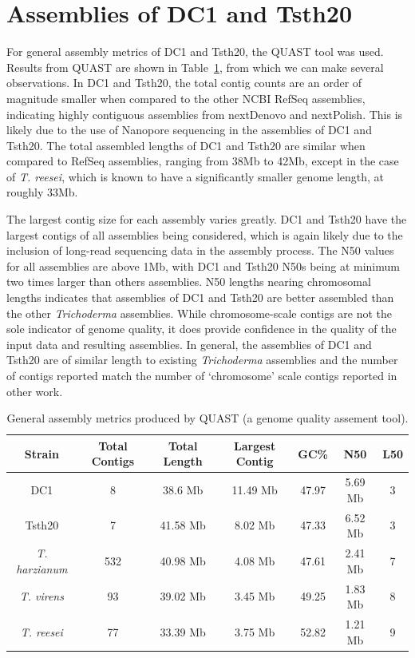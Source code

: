 \section{Assemblies of DC1 and Tsth20}

For general assembly metrics of DC1 and Tsth20, the
QUAST\cite{Gurevich2013} tool was used. Results from QUAST are shown
in Table~\ref{table:assemblies}, from which we can make several
observations. In DC1 and Tsth20, the total contig counts are an order
of magnitude smaller when compared to the other NCBI RefSeq
assemblies, indicating highly contiguous assemblies from
nextDenovo\cite{Hu2024} and nextPolish\cite{Hu2020}. This is likely
due to the use of Nanopore sequencing in the assemblies of DC1 and
Tsth20. The total assembled lengths of DC1 and Tsth20 are similar when
compared to RefSeq assemblies, ranging from 38Mb to 42Mb, except in
the case of \textit{T. reesei}, which is known to have a significantly
smaller genome length\cite{Kubicek2019}, at roughly 33Mb.

The largest contig size for each assembly varies greatly. DC1 and
Tsth20 have the largest contigs of all assemblies being considered,
which is again likely due to the inclusion of long-read sequencing
data in the assembly process. The N50 values for all assemblies are
above 1Mb, with DC1 and Tsth20 N50s being at minimum two times larger
than others assemblies. N50 lengths nearing chromosomal lengths
indicates that assemblies of DC1 and Tsth20 are better assembled than
the other \textit{Trichoderma} assemblies. While chromosome-scale
contigs are not the sole indicator of genome quality, it does provide
confidence in the quality of the input data and resulting
assemblies. In general, the assemblies of DC1 and Tsth20 are of
similar length to existing \textit{Trichoderma} assemblies and the
number of contigs reported match the number of `chromosome' scale
contigs reported in other work\cite{Kubicek2019}.

\begin{table}
  \begin{center}
    \begin{tabular}{|c|c|c|c|c|c|c|}
      \hline
      Strain & Total Contigs & Total Length & Largest Contig & GC\% & N50 & L50 \\ \hline
      DC1 & 8 & 38.6 Mb & 11.49 Mb & 47.97 & 5.69 Mb & 3 \\ \hline
      Tsth20 & 7 & 41.58 Mb & 8.02 Mb & 47.33 & 6.52 Mb & 3 \\ \hline
      \textit{T. harzianum} & 532 & 40.98 Mb & 4.08 Mb & 47.61 & 2.41 Mb & 7 \\ \hline
      \textit{T. virens} & 93 & 39.02 Mb & 3.45 Mb & 49.25 & 1.83 Mb & 8 \\ \hline
      \textit{T. reesei} & 77 & 33.39 Mb & 3.75 Mb & 52.82 & 1.21 Mb & 9 \\ \hline
    \end{tabular}
  \end{center}
  \caption{General assembly metrics produced by
    QUAST\cite{Gurevich2013} (a genome quality assement tool).}
  \label{table:assemblies}
\end{table}

